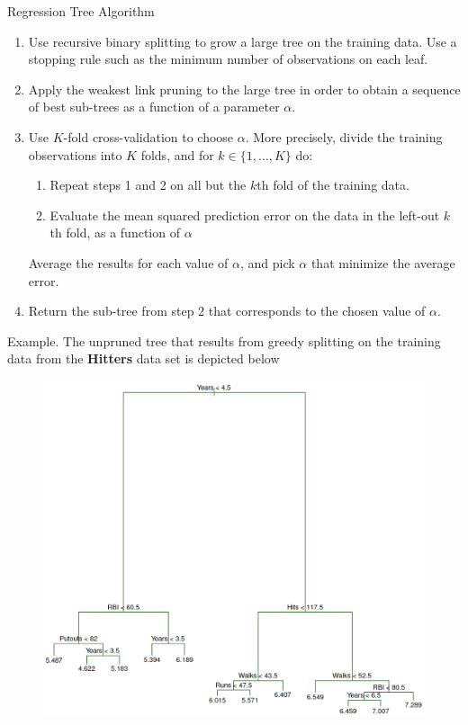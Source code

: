\documentclass{beamer}
\begin{document}
\begin{frame}{Regression Tree Algorithm}
	\begin{enumerate}
		\item Use recursive binary splitting to grow a large tree on the training data. Use a stopping rule such as the minimum number of observations on each leaf.
		\item Apply the weakest link pruning  to the large tree in order to obtain a sequence of best sub-trees as a function of a parameter $\alpha$. 
		\item Use $K$-fold cross-validation to choose $\alpha$. More precisely, divide the training observations into $K$ folds, and for $k \in \{1,\ldots, K\}$ do:
		\begin{enumerate}
			\item Repeat steps 1 and 2 on all but the $k$th fold of the training data.
			\item Evaluate the mean squared prediction error on the data in the left-out $k$th fold, as a function of $\alpha$
		\end{enumerate} 
		Average the results for each value of $\alpha$, and pick $\alpha$ that minimize the average error.
		\item Return the sub-tree from step 2 that corresponds to the chosen value of $\alpha$.
	
	\end{enumerate}
\end{frame}

\begin{frame}{Example. }
	The unpruned tree that results from greedy splitting on the training data from the {\bf Hitters} data set is depicted below

\begin{figure}[h]
	\centering
	\includegraphics[scale=0.3]{../../Figures/fig_hitters_full.png}
\end{figure}
\end{frame}
\end{document}
